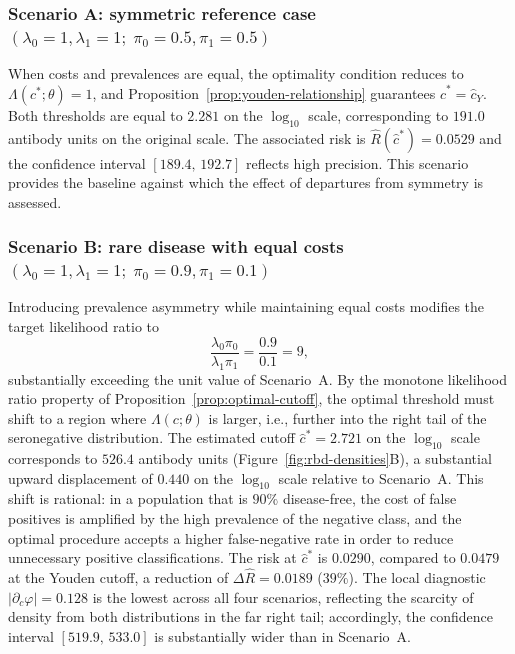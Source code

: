 \documentclass[11pt,a4paper]{article}
\theoremstyle{definition}
\theoremstyle{remark}
\newcommand{\1}{\mathbf{1}}
\begin{document}
\subsubsection{Scenario A: symmetric reference case $(\lambda_0=1,\lambda_1=1;\;\pi_0=0.5,\pi_1=0.5)$}
When costs and prevalences are equal, the optimality
condition reduces to $\Lambda(c^*;\theta)=1$, and
Proposition~\ref{prop:youden-relationship} guarantees
$\hat{c}^*=\hat{c}_Y$.
Both thresholds are equal to $2.281$ on the $\log_{10}$
scale, corresponding to $191.0$ antibody units on the
original scale.
The associated risk is $\hat{R}(\hat{c}^*)=0.0529$
and the confidence interval $[189.4,\,192.7]$ reflects
high precision.
This scenario provides the baseline against which the
effect of departures from symmetry is assessed.

\subsubsection{Scenario B: rare disease with equal costs $(\lambda_0=1,\lambda_1=1;\;\pi_0=0.9,\pi_1=0.1)$}
Introducing prevalence asymmetry while maintaining equal
costs modifies the target likelihood ratio to
\[
\frac{\lambda_0\pi_0}{\lambda_1\pi_1}
=
\frac{0.9}{0.1}
=9,
\]
substantially exceeding the unit value of Scenario~A.
By the monotone likelihood ratio property of
Proposition~\ref{prop:optimal-cutoff}, the optimal
threshold must shift to a region where $\Lambda(c;\theta)$ is
larger, i.e., further into the right tail of the
seronegative distribution.
The estimated cutoff $\hat{c}^*=2.721$ on the $\log_{10}$
scale corresponds to $526.4$ antibody units
(Figure~\ref{fig:rbd-densities}B), a substantial upward
displacement of $0.440$ on the $\log_{10}$ scale
relative to Scenario~A.
This shift is rational: in a population that is $90\%$
disease-free, the cost of false positives is amplified by
the high prevalence of the negative class, and the optimal
procedure accepts a higher false-negative rate in order
to reduce unnecessary positive classifications.
The risk at $\hat{c}^*$ is $0.0290$, compared to
$0.0479$ at the Youden cutoff, a reduction of
$\Delta\hat{R}=0.0189$ ($39\%$).
The local diagnostic $|\partial_c\varphi|=0.128$ is
the lowest across all four scenarios, reflecting the
scarcity of density from both distributions in the far
right tail; accordingly, the confidence interval
$[519.9,\,533.0]$ is substantially wider than in
Scenario~A.
\end{document}
